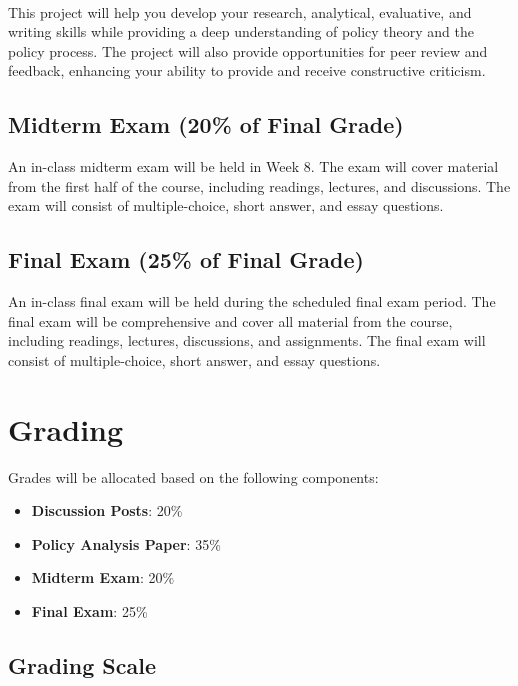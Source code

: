 \documentclass[12pt, letterpaper]{article}
\begin{document}
\paragraph{} This project will help you develop your research, analytical, evaluative, and writing skills while providing a deep understanding of policy theory and the policy process. The project will also provide opportunities for peer review and feedback, enhancing your ability to provide and receive constructive criticism. 

\subsection*{Midterm Exam (20\% of Final Grade)}
An in-class midterm exam will be held in Week 8. The exam will cover material from the first half of the course, including readings, lectures, and discussions. The exam will consist of multiple-choice, short answer, and essay questions.

\subsection*{Final Exam (25\% of Final Grade)}
An in-class final exam will be held during the scheduled final exam period. The final exam will be comprehensive and cover all material from the course, including readings, lectures, discussions, and assignments. The final exam will consist of multiple-choice, short answer, and essay questions.

\section{Grading}
Grades will be allocated based on the following components:
\begin{itemize}
    \item \textbf{Discussion Posts}: 20\%
    \item \textbf{Policy Analysis Paper}: 35\%
    \item \textbf{Midterm Exam}: 20\%
    \item \textbf{Final Exam}: 25\%    
\end{itemize}

\subsection*{Grading Scale}
\end{document}
